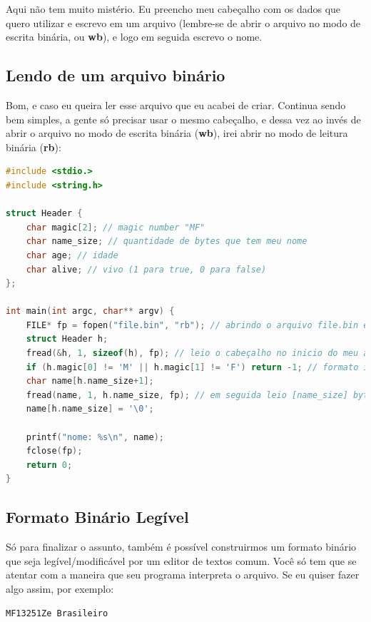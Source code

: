 \documentclass[a4paper,oneside,12pt]{article}
\begin{document}
Aqui não tem muito mistério. Eu preencho meu cabeçalho com os dados que quero utilizar e escrevo em um arquivo (lembre-se de abrir o arquivo no modo de escrita binária, ou \textbf{wb}), e logo em seguida escrevo o nome.

\subsection{Lendo de um arquivo binário}

Bom, e caso eu queira ler esse arquivo que eu acabei de criar. Continua sendo bem simples, a gente só precisar usar o mesmo cabeçalho, e dessa vez ao invés de abrir o arquivo no modo de escrita binária (\textbf{wb}), irei abrir no modo de leitura binária (\textbf{rb}):

\begin{lstlisting}[language=C, caption=Exemplo de leitura em C]
#include <stdio.>
#include <string.h>

struct Header {
    char magic[2]; // magic number "MF"
    char name_size; // quantidade de bytes que tem meu nome
    char age; // idade
    char alive; // vivo (1 para true, 0 para false)
};

int main(int argc, char** argv) {
    FILE* fp = fopen("file.bin", "rb"); // abrindo o arquivo file.bin em modo de leitura binária
    struct Header h;
    fread(&h, 1, sizeof(h), fp); // leio o cabeçalho no inicio do meu arquivo
    if (h.magic[0] != 'M' || h.magic[1] != 'F') return -1; // formato inválido
    char name[h.name_size+1];
    fread(name, 1, h.name_size, fp); // em seguida leio [name_size] bytes, que é o tamanho do meu nome
    name[h.name_size] = '\0';

    printf("nome: %s\n", name);
    fclose(fp);
    return 0;
}
\end{lstlisting}

\subsection{Formato Binário Legível}

Só para finalizar o assunto, também é possível construirmos um formato binário que seja legível/modificável por um editor de textos comum. Você só tem que se atentar com a maneira que seu programa interpreta o arquivo. Se eu quiser fazer algo assim, por exemplo:

\begin{lstlisting}
MF13251Ze Brasileiro
\end{lstlisting}
\end{document}
